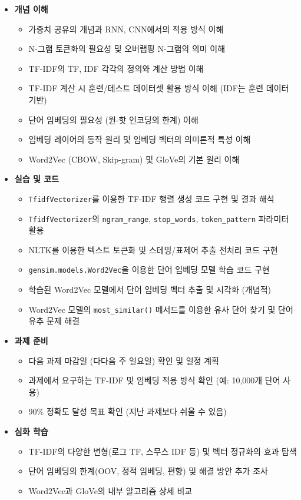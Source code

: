 \documentclass[11pt,a4paper]{article}
\begin{document}
\begin{tcolorbox}[examplebox, title=NLTK 스테밍 코드 예시]
\begin{itemize}
    \item \textbf{개념 이해}
    \begin{itemize}
        \item [ ] 가중치 공유의 개념과 RNN, CNN에서의 적용 방식 이해
        \item [ ] N-그램 토큰화의 필요성 및 오버랩핑 N-그램의 의미 이해
        \item [ ] TF-IDF의 TF, IDF 각각의 정의와 계산 방법 이해
        \item [ ] TF-IDF 계산 시 훈련/테스트 데이터셋 활용 방식 이해 (IDF는 훈련 데이터 기반)
        \item [ ] 단어 임베딩의 필요성 (원-핫 인코딩의 한계) 이해
        \item [ ] 임베딩 레이어의 동작 원리 및 임베딩 벡터의 의미론적 특성 이해
        \item [ ] Word2Vec (CBOW, Skip-gram) 및 GloVe의 기본 원리 이해
    \end{itemize}
    \item \textbf{실습 및 코드}
    \begin{itemize}
        \item [ ] \texttt{TfidfVectorizer}를 이용한 TF-IDF 행렬 생성 코드 구현 및 결과 해석
        \item [ ] \texttt{TfidfVectorizer}의 \texttt{ngram\_range}, \texttt{stop\_words}, \texttt{token\_pattern} 파라미터 활용
        \item [ ] NLTK를 이용한 텍스트 토큰화 및 스테밍/표제어 추출 전처리 코드 구현
        \item [ ] \texttt{gensim.models.Word2Vec}을 이용한 단어 임베딩 모델 학습 코드 구현
        \item [ ] 학습된 Word2Vec 모델에서 단어 임베딩 벡터 추출 및 시각화 (개념적)
        \item [ ] Word2Vec 모델의 \texttt{most\_similar()} 메서드를 이용한 유사 단어 찾기 및 단어 유추 문제 해결
    \end{itemize}
    \item \textbf{과제 준비}
    \begin{itemize}
        \item [ ] 다음 과제 마감일 (다다음 주 일요일) 확인 및 일정 계획
        \item [ ] 과제에서 요구하는 TF-IDF 및 임베딩 적용 방식 확인 (예: 10,000개 단어 사용)
        \item [ ] 90\% 정확도 달성 목표 확인 (지난 과제보다 쉬울 수 있음)
    \end{itemize}
    \item \textbf{심화 학습}
    \begin{itemize}
        \item [ ] TF-IDF의 다양한 변형(로그 TF, 스무스 IDF 등) 및 벡터 정규화의 효과 탐색
        \item [ ] 단어 임베딩의 한계(OOV, 정적 임베딩, 편향) 및 해결 방안 추가 조사
        \item [ ] Word2Vec과 GloVe의 내부 알고리즘 상세 비교
    \end{itemize}
\end{itemize}


\end{tcolorbox}
\end{document}
